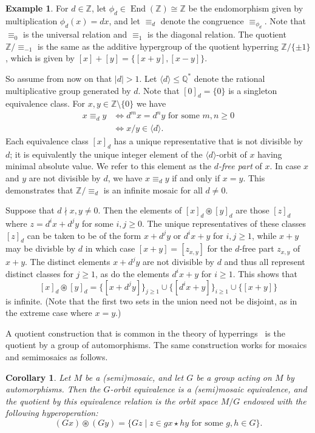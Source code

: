 \documentclass[reqno]{amsart}
\DeclareMathOperator{\End}{End}
\newcommand{\Z}{\mathbb{Z}}
\newcommand{\Q}{\mathbb{Q}}
\newcommand{\ostar}{\circledast}
\numberwithin{equation}{section}
\theoremstyle{plain}
\newtheorem{corollary}[equation]{Corollary}
\theoremstyle{definition}
\newtheorem{example}[equation]{Example}
\begin{document}
\begin{example}
For $d \in \Z$, let $\phi_d \in \End(\Z) \cong \Z$ be the endomorphism given by multiplication $\phi_d(x) = dx$, and let $\equiv_d$ denote the congruence $\equiv_{\phi_d}$. Note that $\equiv_0$ is the universal relation and $\equiv_1$ is the diagonal relation. The quotient $\Z/\equiv_{-1}$ is the same as the additive hypergroup of the quotient hyperring $\Z/\{\pm 1\}$, which is given by $[x]+[y] = \{[x+y], [x-y]\}$.

So assume from now on that $|d| > 1$. Let $\langle d \rangle \leq \Q^*$ denote the rational multiplicative group generated by $d$. Note that $[0]_d = \{0\}$ is a singleton equivalence class. For $x,y \in \Z \setminus \{0\}$ we have
\begin{align*}
x \equiv_d y &\iff d^m x = d^n y \mbox{ for some } m,n \geq 0 \\
&\iff x/y \in \langle d \rangle.
\end{align*}
Each equivalence class $[x]_d$ has a unique representative that is not divisible by~$d$; it is equivalently the unique integer element of the $\langle d \rangle$-orbit of $x$ having minimal absolute value. We refer to this element as the \emph{$d$-free part} of $x$.
In case $x$ and $y$ are not divisible by $d$, we have $x \equiv_d y$ if and only if $x = y$. This demonstrates that $\Z/\equiv_d$ is an infinite mosaic for all $d \neq 0$.

Suppose that $d \nmid x,y \neq 0$. Then the elements of $[x]_d \ostar [y]_d$ are those $[z]_d$ where $z = d^ix + d^jy$ for some $i,j \geq 0$. The unique representatives of these classes $[z]_d$ can be taken to be of the form $x+d^jy$ or $d^ix + y$ for $i,j \geq 1$, while $x+y$ may be divisble by $d$ in which case $[x+y]=[z_{x,y}]$ for the $d$-free part $z_{x,y}$ of $x+y$. 
The distinct elements $x+d^j y$ are not divisible by $d$ and thus all represent distinct classes for $j \geq 1$, as do the elements $d^i x + y$ for $i \geq 1$. This shows that 
\[
[x]_d \ostar [y]_d = \{[x+d^jy]\}_{j \geq 1} \cup \{[d^i x+y]\}_{i \geq 1} \cup \{[x+y]\}
\]
is infinite. (Note that the first two sets in the union need not be disjoint, as in the extreme case where $x = y$.)
\end{example}


A quotient construction that is common in the theory of hyperrings~\cite{Krasner:quotient} is the quotient by a group of automorphisms. The same construction works for mosaics and semimosaics as follows.

\begin{corollary}
Let $M$ be a (semi)mosaic, and let $G$ be a group acting on $M$ by automorphisms. Then the $G$-orbit equivalence is a (semi)mosaic equivalence, and the quotient by this equivalence relation is the orbit space $M/G$ endowed with the following hyperoperation:
\[
(Gx) \ostar (Gy) = \{Gz \mid z \in gx \star hy \mbox{ for some } g,h \in G\}.
\]
\end{corollary}
\end{document}
